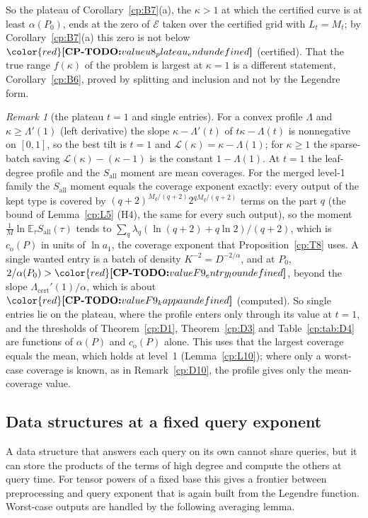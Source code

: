 \documentclass[11pt]{article}
\makeatletter
\theoremstyle{definition}
\theoremstyle{remark}
\newtheorem{remark}[theorem]{Remark}
\DeclareRobustCommand{\CPTODO}[1]{{\color{red}\textbf{[CP-TODO:} #1\textbf{]}}}
\newcommand{\fbat}{f}                         %
\newcommand{\Lamcert}{\Lambda_{\mathrm{cert}}}%
\newcommand{\co}{c_{\mathrm o}}               %
\newcommand{\Hcond}[1]{\textup{(H#1)}}        %
\newcommand{\Pzero}{P_0}                      %
\newcommand{\Sall}{S_{\mathrm{all}}}          %
\newcommand{\Leg}{\mathcal{L}}                        %
\newcommand{\Ebat}{\mathcal{E}}                       %
\newcommand{\cpv}[1]{\ifcsname cpv@#1\endcsname\csname cpv@#1\endcsname\else\CPTODO{value #1 undefined}\fi}
\makeatother
\begin{document}
So the plateau of Corollary~\ref{cp:B7}(a), the $\kappa>1$ at which the certified curve is at least $\alpha(\Pzero)$, ends at the zero of $\Ebat$ taken over the certified grid with $L_t=M_t$; by Corollary~\ref{cp:B7}(a) this zero is not below $\cpv{u8_plateau_end}$ (certified). That the true range $\fbat(\kappa)$ of the problem is largest at $\kappa=1$ is a different statement, Corollary~\ref{cp:B6}, proved by splitting and inclusion and not by the Legendre form.

\begin{remark}[the plateau $t=1$ and single entries]\label{cp:F9}
For a convex profile $\Lambda$ and $\kappa\ge\Lambda'(1)$ (left derivative) the slope $\kappa-\Lambda'(t)$ of $t\kappa-\Lambda(t)$ is nonnegative on $[0,1]$, so the best tilt is $t=1$ and $\Leg(\kappa)=\kappa-\Lambda(1)$; for $\kappa\ge1$ the sparse-batch saving $\Leg(\kappa)-(\kappa-1)$ is the constant $1-\Lambda(1)$. At $t=1$ the leaf-degree profile and the $\Sall$ moment are mean coverages. For the merged level-1 family the $\Sall$ moment equals the coverage exponent exactly: every output of the kept type is covered by $(q+2)^{M_q/(q+2)}2^{qM_q/(q+2)}$ terms on the part $q$ (the bound of Lemma~\ref{cp:L5} \Hcond4, the same for every such output), so the moment $\frac1{M}\ln\mathbb E_\tau\Sall(\tau)$ tends to $\sum_q\lambda_q(\ln(q+2)+q\ln2)/(q+2)$, which is $\co(P)$ in units of $\ln a_1$, the coverage exponent that Proposition~\ref{cp:T8} uses. A single wanted entry is a batch of density $K^{-2}=D^{-2/\alpha}$, and at $\Pzero$, $2/\alpha(\Pzero)>\cpv{F9_entry_lo}$, beyond the slope $\Lamcert'(1)/\alpha$, which is about $\cpv{F9_kappa}$ (computed). So single entries lie on the plateau, where the profile enters only through its value at $t=1$, and the thresholds of Theorem~\ref{cp:D1}, Theorem~\ref{cp:D3} and Table~\ref{cp:tab:D4} are functions of $\alpha(P)$ and $\co(P)$ alone. This uses that the largest coverage equals the mean, which holds at level~1 (Lemma~\ref{cp:L10}); where only a worst-case coverage is known, as in Remark~\ref{cp:D10}, the profile gives only the mean-coverage value.
\end{remark}

\subsection{Data structures at a fixed query exponent}\label{cp:sec:F:frontier}

A data structure that answers each query on its own cannot share queries, but it can store the products of the terms of high degree and compute the others at query time. For tensor powers of a fixed base this gives a frontier between preprocessing and query exponent that is again built from the Legendre function. Worst-case outputs are handled by the following averaging lemma.
\end{document}
